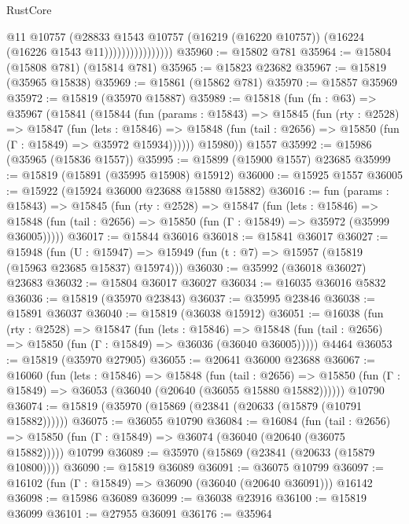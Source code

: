 \begin{lexlean}{RustCore}
\begin{coremodule}
                              @11
                              @10757
                              (@28833
                                @1543
                                @10757
                                (@16219 (@16220 @10757))
                                (@16224 (@16226 @1543 @11))))))))))))))))
@35960 := @15802 @781
@35964 := @15804 (@15808 @781) (@15814 @781)
@35965 := @15823 @23682
@35967 := @15819 (@35965 @15838)
@35969 := @15861 (@15862 @781)
@35970 := @15857 @35969
@35972 := @15819 (@35970 @15887)
@35989 := @15818
    (fun (fn : @63) =>
    @35967
      (@15841
        (@15844
          (fun (params : @15843) =>
          @15845
            (fun (rty : @2528) =>
            @15847
              (fun (lets : @15846) =>
              @15848 (fun (tail : @2656) => @15850 (fun (Γ : @15849) => @35972 @15934))))))
        @15980))
    @1557
@35992 := @15986 (@35965 (@15836 @1557))
@35995 := @15899 (@15900 @1557) @23685
@35999 := @15819 (@15891 (@35995 @15908) @15912)
@36000 := @15925 @1557
@36005 := @15922 (@15924 @36000 @23688 @15880 @15882)
@36016 := fun (params : @15843) =>
  @15845
    (fun (rty : @2528) =>
    @15847
      (fun (lets : @15846) =>
      @15848 (fun (tail : @2656) => @15850 (fun (Γ : @15849) => @35972 (@35999 @36005)))))
@36017 := @15844 @36016
@36018 := @15841 @36017
@36027 := @15948
    (fun (U : @15947) => @15949 (fun (t : @7) => @15957 (@15819 (@15963 @23685 @15837) @15974)))
@36030 := @35992 (@36018 @36027) @23683
@36032 := @15804 @36017 @36027
@36034 := @16035 @36016 @5832
@36036 := @15819 (@35970 @23843)
@36037 := @35995 @23846
@36038 := @15891 @36037
@36040 := @15819 (@36038 @15912)
@36051 := @16038
    (fun (rty : @2528) =>
    @15847
      (fun (lets : @15846) =>
      @15848 (fun (tail : @2656) => @15850 (fun (Γ : @15849) => @36036 (@36040 @36005)))))
    @4464
@36053 := @15819 (@35970 @27905)
@36055 := @20641 @36000 @23688
@36067 := @16060
    (fun (lets : @15846) =>
    @15848
      (fun (tail : @2656) =>
      @15850 (fun (Γ : @15849) => @36053 (@36040 (@20640 (@36055 @15880 @15882))))))
    @10790
@36074 := @15819 (@35970 (@15869 (@23841 (@20633 (@15879 (@10791 @15882))))))
@36075 := @36055 @10790
@36084 := @16084
    (fun (tail : @2656) => @15850 (fun (Γ : @15849) => @36074 (@36040 (@20640 (@36075 @15882)))))
    @10799
@36089 := @35970 (@15869 (@23841 (@20633 (@15879 @10800))))
@36090 := @15819 @36089
@36091 := @36075 @10799
@36097 := @16102 (fun (Γ : @15849) => @36090 (@36040 (@20640 @36091))) @16142
@36098 := @15986 @36089
@36099 := @36038 @23916
@36100 := @15819 @36099
@36101 := @27955 @36091
@36176 := @35964

\end{coremodule}
\end{lexlean}
